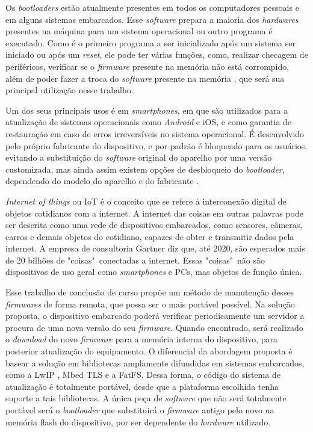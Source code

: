 Os \textit{bootloaders} estão atualmente presentes em todos os computadores pessoais e em alguns sistemas embarcados. Esse \textit{software} prepara a maioria dos \textit{hardwares} presentes na máquina para um sistema operacional ou outro programa é executado.
Como é o primeiro programa a ser inicializado após um sistema ser iniciado ou após um \textit{reset}, ele pode ter várias funções, como, realizar checagem de periféricos, verificar se o \textit{firmware} presente na memória não está corrompido, além de poder fazer a troca do \textit{software} presente na memória \cite{DavesDurlin2013}, que será sua principal utilização nesse trabalho.

Um dos seus principais usos é em \textit{smartphones}, em que são utilizados para a atualização de sistemas operacionais como \textit{Android} e iOS, e como garantia de restauração em caso de erros irreversíveis no sistema operacional. É desenvolvido pelo próprio fabricante do dispositivo, e por padrão é bloqueado para os usuários, evitando a substituição do \textit{software} original do aparelho por uma versão customizada, mas ainda assim existem opções de desbloqueio do \textit{bootloader}, dependendo do modelo do aparelho e do fabricante \cite{Salute2018}.%

\textit{Internet of things} ou IoT é o conceito que se refere à interconexão digital de objetos cotidianos com a internet. A internet das coisas em outras palavras pode ser descrita como uma rede de dispositivos embarcados, como sensores, câmeras, carros e demais objetos do cotidiano, capazes de obter e transmitir dados pela internet. A empresa de consultoria Gartner \cite{Gartner} diz que, até 2020, são esperados mais de 20 bilhões de "coisas"\  conectadas a internet. Essas "coisas"\  não são dispositivos de uso geral como \textit{smartphones} e PCs, mas objetos de função única.

Esse trabalho de conclusão de curso propõe um método de manutenção desses \textit{firmwares} de forma remota, que possa ser o mais portável possível.
Na solução proposta, o dispositivo embarcado poderá verificar periodicamente um servidor a procura de uma nova versão do seu \textit{firmware}. Quando encontrado, será realizado o \textit{download} do novo \textit{firmware} para a memória interna do dispositivo, para posterior atualização do equipamento. O diferencial da abordagem proposta é basear a solução em bibliotecas amplamente difundidas em sistemas embarcados, como a LwIP \cite{LWIP}, Mbed TLS \cite{mbedtls} e a FatFS\cite{FATFS}. Dessa forma, o código do sistema de atualização é totalmente portável, desde que a plataforma escolhida tenha suporte a tais bibliotecas. A única peça de \textit{software} que não será totalmente portável será o \textit{bootloader} que substituirá o \textit{firmware} antigo pelo novo na memória flash do dispositivo, por ser dependente do \textit{hardware} utilizado.


